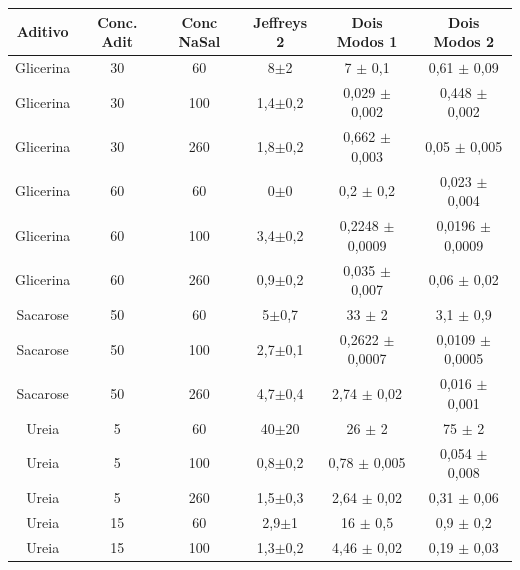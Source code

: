 	\begin{table}[h]
	{%
		\begin{tabular}{c c c | c c c}
			\toprule
			 Aditivo  & Conc. Adit & Conc NaSal & Jeffreys 2    & Dois Modos 1               & Dois Modos 2               \\ \midrule
			Glicerina & 30         & 60         & 8\(\pm\)2     & 7           \(\pm\) 0,1    & 0,61        \(\pm\) 0,09   \\
			Glicerina & 30         & 100        & 1,4\(\pm\)0,2 & 0,029       \(\pm\) 0,002  & 0,448       \(\pm\) 0,002  \\
			Glicerina & 30         & 260        & 1,8\(\pm\)0,2 & 0,662       \(\pm\) 0,003  & 0,05        \(\pm\) 0,005  \\
			Glicerina & 60         & 60         & 0\(\pm\)0     & 0,2         \(\pm\) 0,2    & 0,023       \(\pm\) 0,004  \\
			Glicerina & 60         & 100        & 3,4\(\pm\)0,2 & 0,2248      \(\pm\) 0,0009 & 0,0196      \(\pm\) 0,0009 \\
			Glicerina & 60         & 260        & 0,9\(\pm\)0,2 & 0,035       \(\pm\) 0,007  & 0,06        \(\pm\) 0,02   \\
			Sacarose  & 50         & 60         & 5\(\pm\)0,7   & 33          \(\pm\) 2      & 3,1         \(\pm\) 0,9    \\
			Sacarose  & 50         & 100        & 2,7\(\pm\)0,1 & 0,2622      \(\pm\) 0,0007 & 0,0109      \(\pm\) 0,0005 \\
			Sacarose  & 50         & 260        & 4,7\(\pm\)0,4 & 2,74        \(\pm\) 0,02   & 0,016       \(\pm\) 0,001  \\ \midrule
			  Ureia   & 5          & 60         & 40\(\pm\)20   & 26          \(\pm\) 2      & 75          \(\pm\) 2      \\
			  Ureia   & 5          & 100        & 0,8\(\pm\)0,2 & 0,78        \(\pm\) 0,005  & 0,054       \(\pm\) 0,008  \\
			  Ureia   & 5          & 260        & 1,5\(\pm\)0,3 & 2,64        \(\pm\) 0,02   & 0,31        \(\pm\) 0,06   \\
			  Ureia   & 15         & 60         & 2,9\(\pm\)1   & 16          \(\pm\) 0,5    & 0,9         \(\pm\) 0,2    \\
			  Ureia   & 15         & 100        & 1,3\(\pm\)0,2 & 4,46        \(\pm\) 0,02   & 0,19        \(\pm\) 0,03   \\

\end{tabular}}
\end{table}
